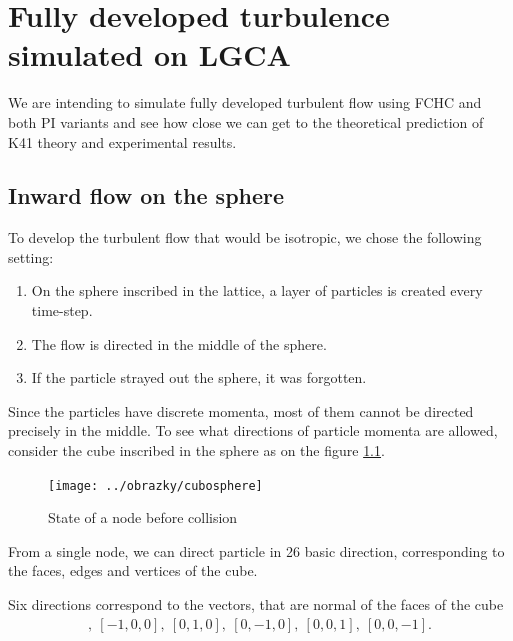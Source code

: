 \chapter{Fully developed turbulence simulated on LGCA}

We are intending to simulate fully developed turbulent flow using FCHC and both  PI variants and see how close we can get to the theoretical prediction of K41 theory and experimental results.

\section{Inward flow on the sphere}
%
%


To develop the turbulent flow that would be isotropic, we chose the following setting:
\begin{enumerate}
\item On the sphere inscribed in the lattice, a layer of particles is created every time-step. 
\item The flow is directed in the middle of the sphere.
\item If the particle strayed out the sphere, it was forgotten. 
\end{enumerate}

Since the particles have discrete momenta, most of them cannot be directed precisely in the middle.
To see what directions of particle momenta are allowed, consider the cube inscribed in the sphere as on the figure \ref{cubosphere}.
\begin{figure}[htbp] 
 \centering 
 \texttt{[image: ../obrazky/cubosphere]}
 \label{cubosphere}
 \caption{State of a node before collision}
\end{figure}
 
From a single node, we can direct particle in 26 basic direction, corresponding to the faces, edges and vertices of the cube.  

Six directions correspond to the vectors, that are normal of the faces of the cube
\begin{align}
[1,0,0],~[-1,0,0],~[0,1,0],~[0,-1,0],~[0,0,1],~[0,0,-1].
\end{align}


